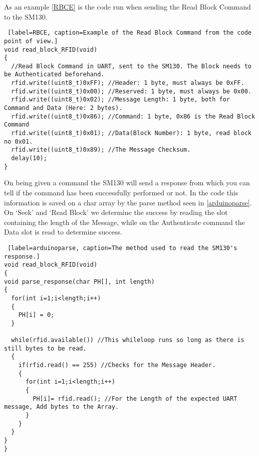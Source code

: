 As an example \autoref{RBCE} is the code run when sending the Read Block Command to the SM130.
\begin{lstlisting} [label=RBCE, caption=Example of the Read Block Command from the code point of view.]
void read_block_RFID(void)
{
  //Read Block Command in UART, sent to the SM130. The Block needs to be Authenticated beforehand.
  rfid.write((uint8_t)0xFF); //Header: 1 byte, must always be 0xFF.
  rfid.write((uint8_t)0x00); //Reserved: 1 byte, must always be 0x00.  
  rfid.write((uint8_t)0x02); //Message Length: 1 byte, both for Command and Data (Here: 2 bytes).
  rfid.write((uint8_t)0x86); //Command: 1 byte, 0x86 is the Read Block Command
  rfid.write((uint8_t)0x01); //Data(Block Number): 1 byte, read block no 0x01. 
  rfid.write((uint8_t)0x89); //The Message Checksum.
  delay(10); 
}													
\end{lstlisting}


On being given a command the SM130 will send a response from which you can tell if the command has been successfully performed or not.
In the code this information is saved on a char array by the parse method seen in \autoref{arduinoparse}. 
On `Seek' and `Read Block' we determine the success by reading the slot containing the length of the Message, while on the Authenticate command the Data slot is read to determine success.

\begin{lstlisting} [label=arduinoparse, caption=The method used to read the SM130's response.]
void read_block_RFID(void)
{
void parse_response(char PH[], int length)
{
  for(int i=1;i<length;i++)
  {
    PH[i] = 0;
  }
  
  while(rfid.available()) //This whileloop runs so long as there is still bytes to be read. 
  {
    if(rfid.read() == 255) //Checks for the Message Header.
    {
      for(int i=1;i<length;i++)
      {
        PH[i]= rfid.read(); //For the Length of the expected UART message, Add bytes to the Array.
      }
    }
  }
}
}													
\end{lstlisting}


